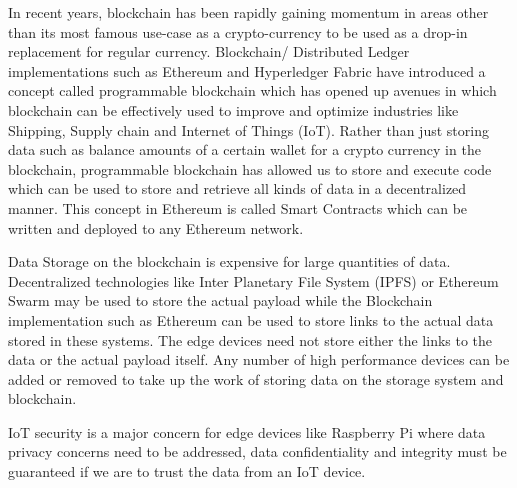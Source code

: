 \documentclass[11pt,openright]{report}
\begin{document}
In recent years, blockchain has been rapidly gaining momentum in areas other than its most famous use-case as a crypto-currency to be used as a drop-in replacement for regular currency. Blockchain/ Distributed Ledger implementations such as Ethereum and Hyperledger Fabric have introduced a concept called programmable blockchain which has opened up avenues in which blockchain can be effectively used to improve and optimize industries like Shipping, Supply chain and Internet of Things (IoT). Rather than just storing data such as balance amounts of a certain wallet for a crypto currency in the blockchain, programmable blockchain has allowed us to store and execute code which can be used to store and retrieve all kinds of data in a decentralized manner. This concept in Ethereum is called Smart Contracts which can be written and deployed to any Ethereum network.

Data Storage on the blockchain is expensive for large quantities of data. Decentralized technologies like Inter Planetary File System (IPFS) or Ethereum Swarm may be used to store the actual payload while the Blockchain implementation such as Ethereum can be used to store links to the actual data stored in these systems. The edge devices need not store either the links to the data or the actual payload itself. Any number of high performance devices can be added or removed to take up the work of storing data on the storage system and blockchain.

IoT security is a major concern for edge devices like Raspberry Pi where data privacy concerns need to be addressed, data confidentiality and integrity must be guaranteed if we are to trust the data from an IoT device. 
\end{document}
